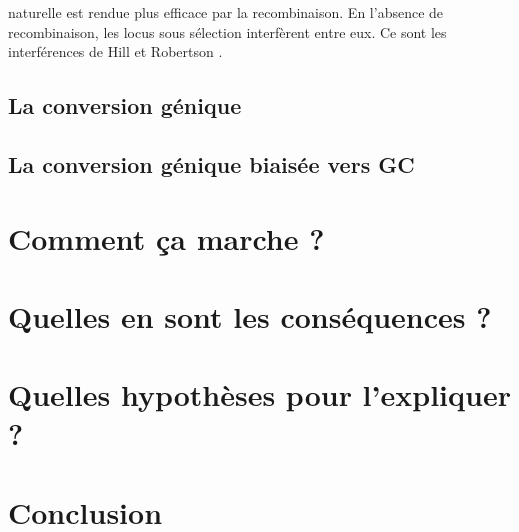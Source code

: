 \documentclass[11pt]{scrartcl}
\begin{document}
 naturelle est rendue plus efficace par la
recombinaison. En l'absence de recombinaison, les locus sous sélection
interfèrent entre eux. Ce sont les interférences de Hill et Robertson
\cite{hill_effect_1966}.

\subsection{La conversion génique}
\label{sec:orgheadline3}
\subsection{La conversion génique biaisée vers GC}
\label{sec:orgheadline4}
\section{Comment ça marche ?}
\label{sec:orgheadline6}
\section{Quelles en sont les conséquences ?}
\label{sec:orgheadline7}
\section{Quelles hypothèses pour l'expliquer ?}
\label{sec:orgheadline8}
\section{Conclusion}
\label{sec:orgheadline9}


\end{document}
